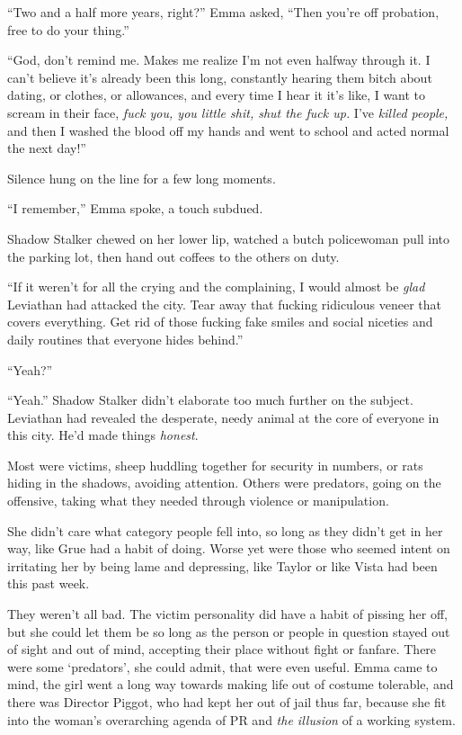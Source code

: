 ``Two and a half more years, right?''  Emma asked, ``Then you're off probation, free to do your thing.''



``God, don't remind me.  Makes me realize I'm not even halfway through it.  I can't believe it's already been this long, constantly hearing them bitch about dating, or clothes, or allowances, and every time I hear it it's like, I want to scream in their face, \emph{fuck you, you little shit, shut the fuck up.}  I've \emph{killed people, }and then I washed the blood off my hands and went to school and acted normal the next day!''



Silence hung on the line for a few long moments.



``I remember,'' Emma spoke, a touch subdued.



Shadow Stalker chewed on her lower lip, watched a butch policewoman pull into the parking lot, then hand out coffees to the others on duty.



``If it weren't for all the crying and the complaining, I would almost be \emph{glad} Leviathan had attacked the city.  Tear away that fucking ridiculous veneer that covers everything.  Get rid of those fucking fake smiles and social niceties and daily routines that everyone hides behind.''



``Yeah?''



``Yeah.''  Shadow Stalker didn't elaborate too much further on the subject.  Leviathan had revealed the desperate, needy animal at the core of everyone in this city.  He'd made things \emph{honest}.



Most were victims, sheep huddling together for security in numbers, or rats hiding in the shadows, avoiding attention.  Others were predators, going on the offensive, taking what they needed through violence or manipulation.



She didn't care what category people fell into, so long as they didn't get in her way, like Grue had a habit of doing.  Worse yet were those who seemed intent on irritating her by being lame and depressing, like Taylor or like Vista had been this past week.



They weren't all bad.  The victim personality did have a habit of pissing her off, but she could let them be so long as the person or people in question stayed out of sight and out of mind, accepting their place without fight or fanfare.  There were some `predators', she could admit, that were even useful.  Emma came to mind, the girl went a long way towards making life out of costume tolerable, and there was Director Piggot, who had kept her out of jail thus far, because she fit into the woman's overarching agenda of PR and \emph{the illusion} of a working system.



